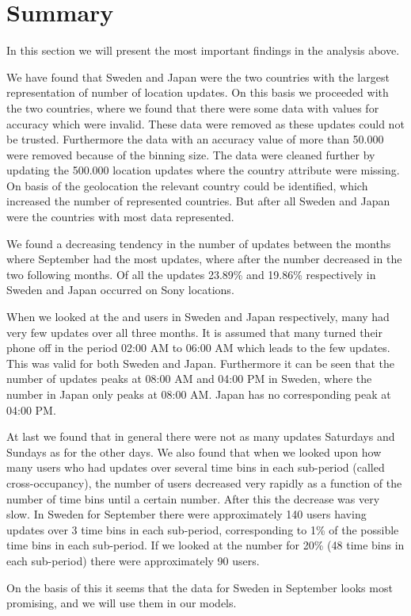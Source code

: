 \section{Summary}
In this section we will present the most important findings in the analysis above. 

We have found that Sweden and Japan were the two countries with the largest representation of number of location updates.  On this basis we proceeded with the two countries, where we found that there were some data with values for accuracy which were invalid. These data were removed as these updates could not be trusted. Furthermore the data with an accuracy value of more than 50.000 were removed because of the binning size. 
The data were cleaned further by updating the 500.000 location updates where the country attribute were missing. On basis of the geolocation the relevant country could be identified, which increased the number of represented countries. But after all Sweden and Japan were the countries with most data represented. 

We found a decreasing tendency in the number of updates between the months where September had the most updates, where after the number decreased in the two following months. Of all the updates 23.89\% and 19.86\% respectively in Sweden and Japan occurred on Sony locations.  

When we looked at the \numberUsersSweden{} and \numberUsersJapan{} users in Sweden and Japan respectively, many had very few updates over all three months. It is assumed that many turned their phone off in the period 02:00 AM to 06:00 AM which leads to the few updates. This was valid for both Sweden and Japan. Furthermore it can be seen that the number of updates peaks at 08:00 AM and 04:00 PM in Sweden, where the number in Japan only peaks at 08:00 AM.  Japan has no corresponding peak at 04:00 PM. 

At last we found that in general there were not as many updates Saturdays and Sundays as for the other days. We also found that when we looked upon how many users who had updates over several time bins in each sub-period (called cross-occupancy), the number of users decreased very rapidly as a function of the number of time bins until a certain number. After this the decrease was very slow. In Sweden for September there were approximately 140 users having updates over 3 time bins in each sub-period, corresponding to 1\% of the possible time bins in each sub-period. If we looked at the number for 20\% (48 time bins in each sub-period) there were approximately 90  users. 

On the basis of this it seems that the data for Sweden in September looks most promising, and we will use them in our models. 